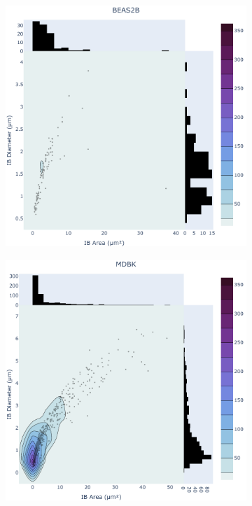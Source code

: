\begin{figure}
    \medskip
    \begin{subfigure}{0.495\textwidth}
        \caption{}
        \includegraphics[width=\textwidth]{09. Chapter 4/Figs/01. Localisation introduction/04. heatmap_beas2b.pdf} 
    \end{subfigure}
    \hfill
    \begin{subfigure}{0.495\textwidth}
        \caption{}
        \includegraphics[width=\textwidth]{09. Chapter 4/Figs/01. Localisation introduction/05. heatmap_mdbk.pdf} 
    \end{subfigure}
    

\end{figure}
